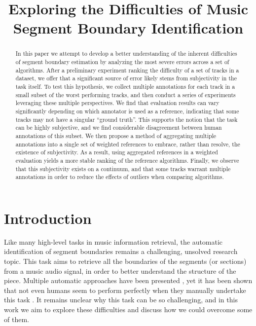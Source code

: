 \documentclass{article}
\title{Exploring the Difficulties of Music Segment Boundary Identification}
\begin{document}
%
\maketitle
%
\begin{abstract}
In this paper we attempt to develop a better understanding of the inherent difficulties of segment boundary estimation by analyzing the most severe errors across a set of algorithms.
After a preliminary experiment ranking the difficulty of a set of tracks in a dataset, we offer that a significant source of error likely stems from subjectivity in the task itself.
To test this hypothesis, we collect multiple annotations for each track in a small subset of the worst performing tracks, and then conduct a series of experiments leveraging these multiple perspectives.
We find that evaluation results can vary significantly depending on which annotator is used as a reference, indicating that some tracks may not have a singular ``ground truth''.
This supports the notion that the task can be highly subjective, and we find considerable disagreement between human annotations of this subset.
We then propose a method of aggregating multiple annotations into a single set of weighted references to embrace, rather than resolve, the existence of subjectivity.
As a result, using  aggregated references in a weighted evaluation yields a more stable ranking of the reference algorithms. 
Finally, we observe that this subjectivity exists on a continuum, and that some tracks warrant multiple annotations in order to reduce the effects of outliers when comparing algorithms.

  
\end{abstract}
%
\section{Introduction}\label{sec:introduction}

Like many high-level tasks in music information retrieval, the automatic identification of segment boundaries remains a challenging, unsolved research topic. 
This task aims to retrieve all the boundaries of the segments (or sections) from a music audio signal, in order to better understand the structure of the piece.
Multiple automatic approaches have been presented \cite{Paulus2010}, yet it has been shown that not even humans seem to perform perfectly when they manually undertake this task \cite{Serra2013}.
It remains unclear why this task can be so challenging, and in this work we aim to explore these difficulties and discuss how we could overcome some of them.
\end{document}
